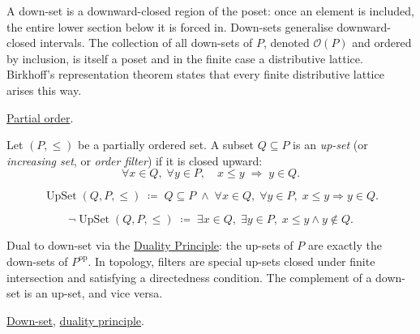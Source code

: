 \begin{remark*}[Interpretation]
A down-set is a downward-closed region of the poset: once an element is
included, the entire lower section below it is forced in.  Down-sets
generalise downward-closed intervals.  The collection of all down-sets of
$P$, denoted $\mathcal{O}(P)$ and ordered by inclusion, is itself a poset
and in the finite case a distributive lattice.  Birkhoff's representation
theorem states that every finite distributive lattice arises this way.
\end{remark*}

\begin{remark*}[Dependencies]
\hyperref[def:lattice-order-partial-order]{Partial order}.
\end{remark*}


\begin{tcolorbox}[colback=defbox, colframe=defborder, arc=2pt,
  left=6pt, right=6pt, top=4pt, bottom=4pt,
  title={\small\textbf{Definition (Up-Set)}},
  fonttitle=\small\bfseries]
\begin{definition}[Up-Set]
\label{def:up-set}
Let $(P, \leq)$ be a partially ordered set.  A subset $Q \subseteq P$ is
an \emph{up-set} (or \emph{increasing set}, or \emph{order filter}) if it
is closed upward:
\[
\forall x \in Q,\; \forall y \in P,\quad x \leq y \;\Longrightarrow\; y \in Q.
\]
\end{definition}
\end{tcolorbox}

\begin{remark*}
\[
\operatorname{UpSet}(Q, P, \leq)
\;\coloneqq\;
Q \subseteq P
\;\land\;
\forall x \in Q,\; \forall y \in P,\;
x \leq y \Rightarrow y \in Q.
\]
\end{remark*}

\begin{remark*}
\[
\neg\operatorname{UpSet}(Q, P, \leq)
\;\coloneqq\;
\exists x \in Q,\; \exists y \in P,\;
x \leq y \land y \notin Q.
\]
\end{remark*}

\begin{remark*}[Interpretation]
Dual to down-set via the
\hyperref[prop:duality-principle]{Duality Principle}: the up-sets of $P$
are exactly the down-sets of $P^{\mathrm{op}}$.  In topology, filters are
special up-sets closed under finite intersection and satisfying a
directedness condition.  The complement of a down-set is an up-set, and
vice versa.
\end{remark*}

\begin{remark*}[Dependencies]
\hyperref[def:down-set]{Down-set},
\hyperref[prop:duality-principle]{duality principle}.
\end{remark*}
